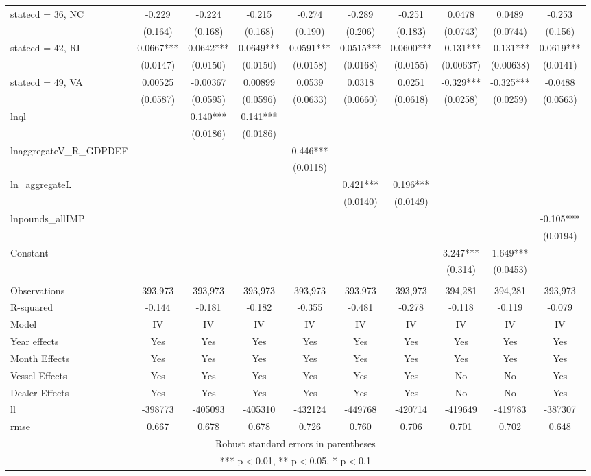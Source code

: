 \begin{tabular}{lccccccccc}
statecd = 36, NC & -0.229 & -0.224 & -0.215 & -0.274 & -0.289 & -0.251 & 0.0478 & 0.0489 & -0.253 \\
 & (0.164) & (0.168) & (0.168) & (0.190) & (0.206) & (0.183) & (0.0743) & (0.0744) & (0.156) \\
statecd = 42, RI & 0.0667*** & 0.0642*** & 0.0649*** & 0.0591*** & 0.0515*** & 0.0600*** & -0.131*** & -0.131*** & 0.0619*** \\
 & (0.0147) & (0.0150) & (0.0150) & (0.0158) & (0.0168) & (0.0155) & (0.00637) & (0.00638) & (0.0141) \\
statecd = 49, VA & 0.00525 & -0.00367 & 0.00899 & 0.0539 & 0.0318 & 0.0251 & -0.329*** & -0.325*** & -0.0488 \\
 & (0.0587) & (0.0595) & (0.0596) & (0.0633) & (0.0660) & (0.0618) & (0.0258) & (0.0259) & (0.0563) \\
lnql &  & 0.140*** & 0.141*** &  &  &  &  &  &  \\
 &  & (0.0186) & (0.0186) &  &  &  &  &  &  \\
lnaggregateV\_R\_GDPDEF &  &  &  & 0.446*** &  &  &  &  &  \\
 &  &  &  & (0.0118) &  &  &  &  &  \\
ln\_aggregateL &  &  &  &  & 0.421*** & 0.196*** &  &  &  \\
 &  &  &  &  & (0.0140) & (0.0149) &  &  &  \\
lnpounds\_allIMP &  &  &  &  &  &  &  &  & -0.105*** \\
 &  &  &  &  &  &  &  &  & (0.0194) \\
Constant &  &  &  &  &  &  & 3.247*** & 1.649*** &  \\
 &  &  &  &  &  &  & (0.314) & (0.0453) &  \\
 &  &  &  &  &  &  &  &  &  \\
Observations & 393,973 & 393,973 & 393,973 & 393,973 & 393,973 & 393,973 & 394,281 & 394,281 & 393,973 \\
R-squared & -0.144 & -0.181 & -0.182 & -0.355 & -0.481 & -0.278 & -0.118 & -0.119 & -0.079 \\
Model & IV & IV & IV & IV & IV & IV & IV & IV & IV \\
Year effects & Yes & Yes & Yes & Yes & Yes & Yes & Yes & Yes & Yes \\
Month Effects & Yes & Yes & Yes & Yes & Yes & Yes & Yes & Yes & Yes \\
Vessel Effects & Yes & Yes & Yes & Yes & Yes & Yes & No & No & Yes \\
Dealer Effects & Yes & Yes & Yes & Yes & Yes & Yes & No & No & Yes \\
ll & -398773 & -405093 & -405310 & -432124 & -449768 & -420714 & -419649 & -419783 & -387307 \\
 rmse & 0.667 & 0.678 & 0.678 & 0.726 & 0.760 & 0.706 & 0.701 & 0.702 & 0.648 \\ \hline
\multicolumn{10}{c}{ Robust standard errors in parentheses} \\
\multicolumn{10}{c}{ *** p$<$0.01, ** p$<$0.05, * p$<$0.1} \\
\end{tabular}

